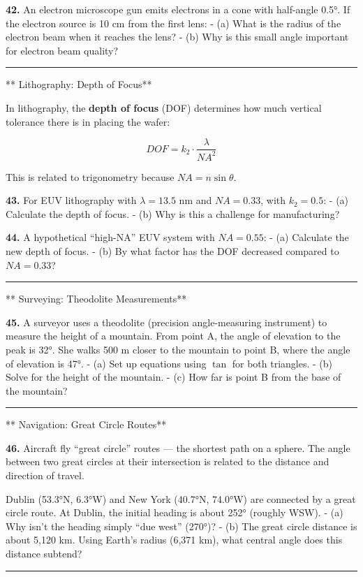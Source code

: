 \documentclass[
  11pt,
]{article}
\begin{document}
\textbf{42.} An electron microscope gun emits electrons in a cone with
half-angle 0.5°. If the electron source is 10 cm from the first lens: -
(a) What is the radius of the electron beam when it reaches the lens? -
(b) Why is this small angle important for electron beam quality?

\begin{center}\rule{0.5\linewidth}{0.5pt}\end{center}

** Lithography: Depth of Focus**

In lithography, the \textbf{depth of focus} (DOF) determines how much
vertical tolerance there is in placing the wafer:

\[DOF = k_2 \cdot \frac{\lambda}{NA^2}\]

This is related to trigonometry because \(NA = n\sin\theta\).

\textbf{43.} For EUV lithography with \(\lambda = 13.5\) nm and
\(NA = 0.33\), with \(k_2 = 0.5\): - (a) Calculate the depth of focus. -
(b) Why is this a challenge for manufacturing?

\textbf{44.} A hypothetical ``high-NA'' EUV system with \(NA = 0.55\): -
(a) Calculate the new depth of focus. - (b) By what factor has the DOF
decreased compared to \(NA = 0.33\)?

\begin{center}\rule{0.5\linewidth}{0.5pt}\end{center}

** Surveying: Theodolite Measurements**

\textbf{45.} A surveyor uses a theodolite (precision angle-measuring
instrument) to measure the height of a mountain. From point A, the angle
of elevation to the peak is 32°. She walks 500 m closer to the mountain
to point B, where the angle of elevation is 47°. - (a) Set up equations
using \(\tan\) for both triangles. - (b) Solve for the height of the
mountain. - (c) How far is point B from the base of the mountain?

\begin{center}\rule{0.5\linewidth}{0.5pt}\end{center}

** Navigation: Great Circle Routes**

\textbf{46.} Aircraft fly ``great circle'' routes --- the shortest path
on a sphere. The angle between two great circles at their intersection
is related to the distance and direction of travel.

Dublin (53.3°N, 6.3°W) and New York (40.7°N, 74.0°W) are connected by a
great circle route. At Dublin, the initial heading is about 252°
(roughly WSW). - (a) Why isn't the heading simply ``due west'' (270°)? -
(b) The great circle distance is about 5,120 km. Using Earth's radius
(6,371 km), what central angle does this distance subtend?

\begin{center}\rule{0.5\linewidth}{0.5pt}\end{center}
\end{document}
